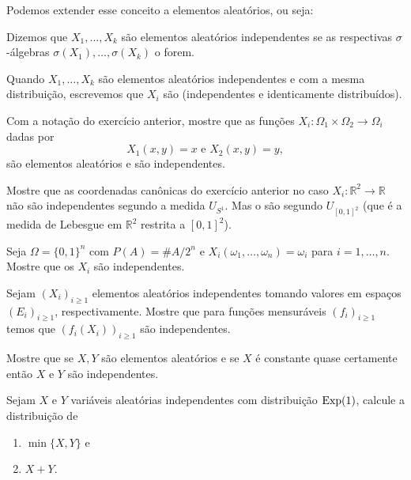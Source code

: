 Podemos extender esse conceito a elementos aleatórios, ou seja:
\begin{definition}
  Dizemos que $X_1, \dots, X_k$ são elementos aleatórios independentes  se as respectivas $\sigma$-álgebras $\sigma(X_1), \dots, \sigma(X_k)$ o forem.
\end{definition}

Quando $X_1, \dots, X_k$ são elementos aleatórios independentes e com a mesma distribuição, escrevemos que $X_i$ são \iid (independentes e identicamente distribuídos).

\begin{exercise}
  Com a notação do exercício anterior, mostre que as funções $X_i:\Omega_1 \times \Omega_2 \to \Omega_i$ dadas por
  \begin{equation}
    X_1(x,y) = x \text{ e } X_2 (x,y) = y,
  \end{equation}
  são elementos aleatórios e são independentes.
\end{exercise}

\begin{exercise}
  Mostre que as coordenadas canônicas do exercício anterior no caso $X_i: \mathbb{R}^2 \to \mathbb{R}$ não são independentes segundo a medida $U_{S^1}$.
  Mas o são segundo $U_{[0,1]^2}$ (que é a medida de Lebesgue em $\mathbb{R}^2$ restrita a $[0,1]^2$).
\end{exercise}

\begin{exercise}
  Seja $\Omega = \{0,1\}^n$ com $P(A) = \#A/2^n$ e $X_i(\omega_1, \dots, \omega_n) = \omega_i$ para $i = 1, \dots, n$.
  Mostre que os $X_i$ são independentes.
\end{exercise}

\begin{exercise}
  Sejam $(X_i)_{i \geq 1}$ elementos aleatórios independentes tomando valores em espaços $(E_i)_{i \geq 1}$, respectivamente.
  Mostre que para funções mensuráveis $(f_i)_{i \geq 1}$ temos que $(f_i(X_i))_{i \geq 1}$ são independentes.
\end{exercise}

\begin{exercise}
  Mostre que se $X, Y$ são elementos aleatórios e se $X$ é constante quase certamente então $X$ e $Y$ são independentes.
\end{exercise}

\begin{exercise}
  Sejam $X$ e $Y$ variáveis aleatórias independentes com distribuição $\operatorname{Exp}(1)$, calcule a distribuição de
  \begin{enumerate}[\quad a)]
  \item $\min\{X,Y\}$ e
  \item $X + Y$.
  \end{enumerate}
\end{exercise}


